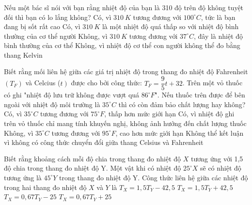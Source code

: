 \begin{ex} 
	Nếu một bác sĩ nói với bạn rằng nhiệt độ của bạn là 310 độ trên độ không tuyệt đối thì bạn có lo lắng không?
	\choice
	{Có, vì \( 310\ K \) tương đương với \( 100^\circ C \), tức là bạn đang bị sốt rất cao}
	{Có, vì \( 310\ K \) là một nhiệt độ quá thấp so với nhiệt độ bình thường của cơ thể người}
	{\True Không, vì \( 310\ K \) tương đương với \( 37^\circ C \), đây là nhiệt độ bình thường của cơ thể}
	{Không, vì nhiệt độ cơ thể con người không thể đo bằng thang Kelvin}
\end{ex}

\begin{ex} 
	Biết rằng mối liên hệ giữa các giá trị nhiệt độ trong thang đo nhiệt độ
	Fahrenheit $\left(T_{F}\right)$ và Celcius ($\left.t\right)$ được cho bởi công thức: $T_{F}=\dfrac{9}{5} t+32$. Trên một vỏ thuốc có ghi "nhiệt độ lưu trữ không được vượt quá $86^\circ F$". Nếu thuốc trên được để bên ngoài với nhiệt độ môi trường là $35^\circ C$ thì có còn đảm bảo chất lượng hay không?
	\choice
	{Có, vì \( 35^\circ C \) tương đương với \( 75^\circ F \), thấp hơn mức giới hạn}
	{Có, vì nhiệt độ ghi trên vỏ thuốc chỉ mang tính khuyến nghị, không ảnh hưởng đến chất lượng thuốc}
	{\True Không, vì \( 35^\circ C \) tương đương với \( 95^\circ F \), cao hơn mức giới hạn}
	{Không thể kết luận vì không có công thức chuyển đổi giữa thang Celsius và Fahrenheit}
\end{ex}

\begin{ex} 
	Biết rằng khoảng cách mỗi độ chia trong thang đo nhiệt độ $X$ tương ứng với 1,5 độ chia trong thang đo nhiệt độ Y. Một vật khi có nhiệt độ $25^\circ X$ sẽ có nhiệt độ tương ứng là $45^\circ Y$ trong thang đo nhiệt độ Y. Công thức liên hệ giữa các nhiệt độ trong hai thang đo nhiệt độ $X$ và $Y$ là
	\choice
	{\True \( T_X = 1,5 T_Y - 42,5 \)}
	{\( T_X = 1,5 T_Y + 42,5 \)}
	{\( T_X = 0,67 T_Y - 25 \)}
	{\( T_X = 0,67 T_Y + 25 \)}
\end{ex}



